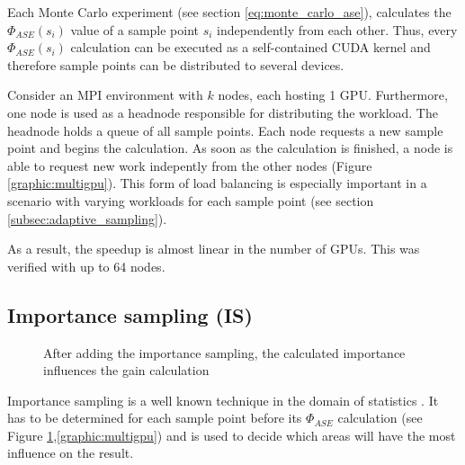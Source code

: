 Each Monte Carlo experiment (see section \ref{eq:monte_carlo_ase}), calculates
the $\Phi_{ASE}(s_i)$ value of a sample point $s_i$ independently from each
other. Thus, every $\Phi_{ASE}(s_i)$ calculation can be executed as a
self-contained CUDA kernel and therefore sample points can be distributed to
several devices.

Consider an MPI environment with $k$ nodes, each hosting 1 GPU. Furthermore, one
node is used as a headnode responsible for distributing the workload. The
headnode holds a queue of all sample points. Each node requests a new sample
point and begins the calculation. As soon as the calculation is finished, a node
is able to request new work indepently from the other nodes (Figure
\ref{graphic:multigpu}). This form of load balancing is especially important in a
scenario with varying workloads for each sample point (see section
\ref{subsec:adaptive_sampling}).

As a result, the speedup is almost linear in the number of GPUs. This was
verified with up to 64 nodes.
    

\subsection{Importance sampling (IS)}
\label{subsec:importance_sampling}
\begin{figure}[H]
  \centerline
  {}
  \caption{After adding the importance sampling, the calculated importance 
  influences the gain calculation}
  \label{graphic:pap2}
\end{figure}
Importance sampling is a well known technique in the domain
of statistics \cite{importanceSamplingSource}. It has to be determined for each
sample point before its $\Phi_{ASE}$ calculation (see Figure \ref{graphic:pap2},\ref{graphic:multigpu}) and is used 
to decide which areas will have the most influence on the result.

